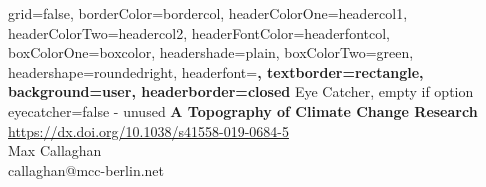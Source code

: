 \documentclass[a0paper,portrait]{baposter}
\begin{document}

\background{
}

\begin{poster}{
	grid=false,
	borderColor=bordercol,
	headerColorOne=headercol1,
	headerColorTwo=headercol2,
	headerFontColor=headerfontcol,
	boxColorOne=boxcolor,
	headershade=plain,
	boxColorTwo=green,
	headershape=roundedright,
	headerfont=\Large\sf\bf,
	textborder=rectangle,
	background=user,
  	headerborder=closed
}
{
	Eye Catcher, empty if option eyecatcher=false - unused
}
{\sf\bf
	A Topography of Climate Change Research
}
{
	\vspace{0.4em} \url{https://dx.doi.org/10.1038/s41558-019-0684-5}\\
	Max Callaghan\\
	{\smaller callaghan@mcc-berlin.net}
}
{
\setlength\fboxsep{0pt}
\setlength\fboxrule{0.5pt}
}




\end{poster}
\end{document}

